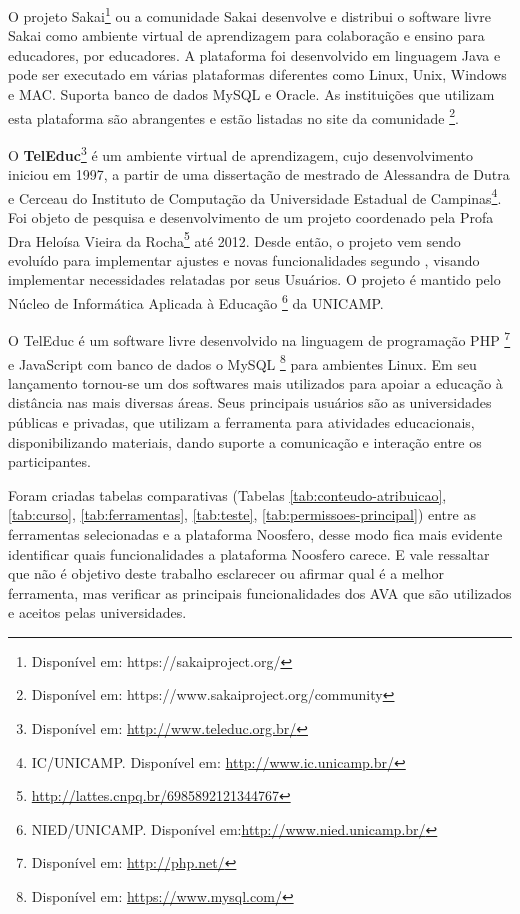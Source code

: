 O projeto Sakai\footnote{Disponível em: https://sakaiproject.org/ } ou a comunidade Sakai desenvolve e distribui o software livre Sakai como ambiente virtual de aprendizagem para colaboração e ensino para educadores, por educadores. A plataforma foi desenvolvido em linguagem Java e pode ser executado em várias plataformas diferentes como Linux, Unix, Windows e MAC. Suporta banco de dados MySQL e Oracle. As instituições que utilizam esta plataforma são abrangentes e estão listadas no site da comunidade \footnote{Disponível em: https://www.sakaiproject.org/community}.

O \textbf{TelEduc}\footnote{Disponível em: \url{http://www.teleduc.org.br/}} é um ambiente virtual de aprendizagem, cujo desenvolvimento iniciou em 1997, a partir de uma dissertação de mestrado de Alessandra de Dutra e Cerceau do Instituto de Computação da Universidade Estadual de Campinas\footnote{IC/UNICAMP. Disponível em: \url{http://www.ic.unicamp.br/}}. Foi objeto de pesquisa e desenvolvimento de um projeto coordenado pela Profa Dra Heloísa Vieira da Rocha\footnote{\url{http://lattes.cnpq.br/6985892121344767}} até 2012. Desde então, o projeto vem sendo evoluído para implementar ajustes e novas funcionalidades segundo \cite{rocha2002ambiente}, visando implementar necessidades relatadas por seus Usuários. O projeto é mantido pelo Núcleo de Informática Aplicada à Educação \footnote{NIED/UNICAMP. Disponível em:\url{http://www.nied.unicamp.br/}} da UNICAMP.

O TelEduc é um software livre desenvolvido na linguagem de programação PHP \footnote{Disponível em: \url{http://php.net/}} e JavaScript com banco de dados o MySQL \footnote{Disponível em: \url{https://www.mysql.com/}} para ambientes Linux. Em seu lançamento tornou-se um dos softwares mais utilizados para apoiar a educação à distância nas mais diversas áreas. Seus principais usuários são as universidades públicas e privadas, que utilizam a ferramenta para atividades educacionais, disponibilizando materiais, dando suporte a comunicação e interação entre os participantes.

Foram criadas tabelas comparativas (Tabelas \ref{tab:conteudo-atribuicao}, \ref{tab:curso}, \ref{tab:ferramentas}, \ref{tab:teste}, \ref{tab:permissoes-principal}) entre as ferramentas selecionadas e a plataforma Noosfero, desse modo fica mais evidente identificar quais funcionalidades a plataforma Noosfero carece. E vale ressaltar que não é objetivo deste trabalho esclarecer ou afirmar qual é a melhor ferramenta, mas verificar as principais funcionalidades dos AVA que são utilizados e aceitos pelas universidades.


